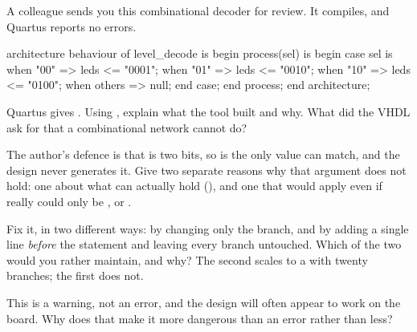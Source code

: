 \label{c5:ex:latch}
A colleague sends you this combinational decoder for review. It compiles, and Quartus reports no
errors.

\begin{vhdlcode}
architecture behaviour of level_decode is
begin
    process(sel) is
    begin
        case sel is
            when "00"   => leds <= "0001";
            when "01"   => leds <= "0010";
            when "10"   => leds <= "0100";
            when others => null;
        end case;
    end process;
end architecture;
\end{vhdlcode}

 Quartus gives . Using
, explain what the tool built and why. What did the VHDL ask for that a
combinational network cannot do?

 The author's defence is that  is two bits, so  is the only value
 can match, and the design never generates it. Give two separate reasons why that
argument does not hold: one about what  can actually hold (), and one
that would apply even if  really could only be ,  or .

 Fix it, in two different ways: by changing only the  branch, and by
adding a single line \emph{before} the  statement and leaving every branch untouched.
Which of the two would you rather maintain, and why? The second scales to a  with twenty
branches; the first does not.

 This is a warning, not an error, and the design will often appear to work on the board.
Why does that make it more dangerous than an error rather than less?
